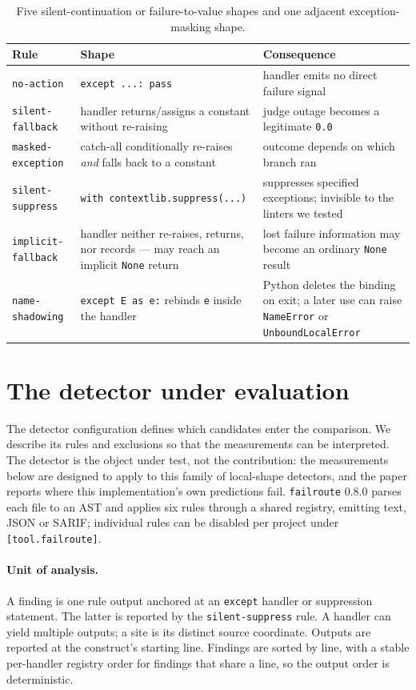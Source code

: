 \documentclass[10pt,a4paper]{article}
\begin{document}
\begin{table}[htbp]
\centering\small
\caption{Five silent-continuation or failure-to-value shapes and one adjacent
exception-masking shape.}
\label{tab:shapes}
\begin{tabular}{@{}P{3.0cm}P{5.3cm}P{6.0cm}@{}}
\toprule
Rule & Shape & Consequence \\
\midrule
\texttt{no-action} & \texttt{except ...: pass} & handler emits no direct
failure signal \\
\texttt{silent-fallback} & handler returns/assigns a constant without re-raising
& judge outage becomes a legitimate \texttt{0.0} \\
\texttt{masked-exception} & catch-all conditionally re-raises \emph{and} falls
back to a constant & outcome depends on which branch ran \\
\texttt{silent-suppress} & \texttt{with contextlib.suppress(...)} & suppresses
specified exceptions; invisible to the linters we tested \\
\texttt{implicit-fallback} & handler neither re-raises, returns, nor records ---
may reach an implicit \texttt{None} return & lost failure information may
become an ordinary \texttt{None} result \\
\texttt{name-shadowing} & \texttt{except E as e:} rebinds \texttt{e} inside the
handler & Python deletes the binding on exit; a later use can raise
\texttt{NameError} or \texttt{UnboundLocalError} \\
\bottomrule
\end{tabular}
\end{table}

\section{The detector under evaluation}
\label{sec:detector}

The detector configuration defines which candidates enter the comparison.
We describe its rules and exclusions so that the measurements can be interpreted.
The detector is the object under test, not the contribution: the measurements
below are designed to apply to this family of local-shape detectors, and the
paper reports where this implementation's own predictions fail. \texttt{failroute} 0.8.0 parses each file to an
AST and applies six rules through a shared registry, emitting text, JSON or
SARIF; individual rules can be disabled per project under
\texttt{[tool.failroute]}.

\paragraph{Unit of analysis.} A finding is one rule output anchored at an
\texttt{except} handler or suppression statement. The latter is reported
by the \texttt{silent-suppress} rule. A handler can yield multiple outputs;
a site is its distinct source coordinate. Outputs are reported at the
construct's starting line. Findings are sorted by line,
with a stable per-handler registry order for findings that share a line, so the
output order is deterministic.
\end{document}
